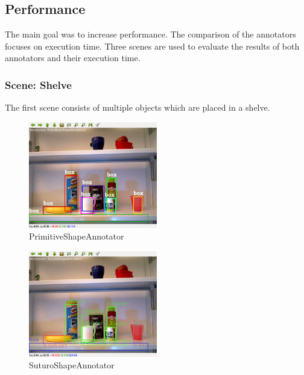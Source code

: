 \documentclass[main.tex]{subfiles}
\begin{document}
\subsection{Performance}
The main goal was to increase performance. The comparison of the annotators focuses on execution time.
Three scenes are used to evaluate the results of both annotators and their execution time.

\subsubsection{Scene: Shelve}
The first scene consists of multiple objects which are placed in a shelve.
\begin{figure}
  \center
  \includegraphics[width=0.5\textwidth]{pictures/perception/shape_annotator/classification_test_shelve/primitive.png}
  \caption{PrimitiveShapeAnnotator}
  \label{fig:shapeAnnotatorShelvePrimitive}
\end{figure}
\begin{figure}
  \center
  \includegraphics[width=0.5\textwidth]{pictures/perception/shape_annotator/classification_test_shelve/suturo.png}
  \caption{SuturoShapeAnnotator}
  \label{fig:shapeAnnotatorShelveSuturo}
\end{figure}
\end{document}
